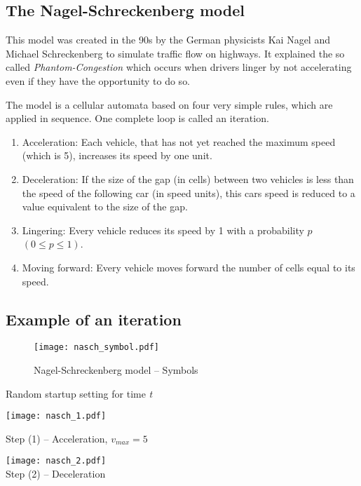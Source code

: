 \subsection{The Nagel-Schreckenberg model}
This model was created in the 90s by the German physicists Kai Nagel and Michael Schreckenberg to simulate 
traffic flow on highways. It explained the so called \textit{Phantom-Congestion} which occurs when drivers 
linger by not accelerating even if they have the opportunity to do so.

The model is a cellular automata based on four very simple rules, which are applied in sequence. One complete loop is called an iteration.

\begin{enumerate}
\item Acceleration: Each vehicle, that has not yet reached the maximum speed (which is 5), increases its speed by one unit.
\item Deceleration: If the size of the gap (in cells) between two vehicles is less than the speed of the following car (in speed units), this cars speed is reduced to a value equivalent to the size of the gap.
\item Lingering: Every vehicle reduces its speed by 1 with a probability $p$ $(0 \leq p \leq 1)$.
\item Moving forward: Every vehicle moves forward the number of cells equal to its speed.
\end{enumerate}

\subsection{Example of an iteration}
\begin{figure}[H]
\texttt{[image: nasch\_symbol.pdf]}
\caption{Nagel-Schreckenberg model -- Symbols}
\end{figure}

Random startup setting for time \textit{t}\\ \vspace{-.2cm}

\texttt{[image: nasch\_1.pdf]}

\vspace*{1cm}

Step (1) -- Acceleration, $v_{max} = 5$\\ \vspace{-.2cm}

\texttt{[image: nasch\_2.pdf]}\vspace*{1cm}
\\
Step (2) -- Deceleration\\ \vspace{-.2cm}

